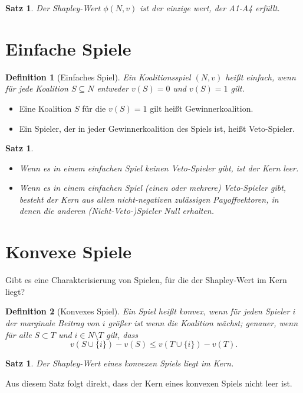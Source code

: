 \documentclass[12pt]{extreport} %
\theoremstyle{named}
\theoremstyle{itshape}
\newtheorem{satz}[unnamedtheorem]{Satz}
\newtheorem*{definition}{Definition}
\theoremstyle{normal}
\begin{document}
\begin{satz}
	Der Shapley-Wert $\phi(N, v)$ ist der einzige wert, der A1-A4 erfüllt.
\end{satz}

\section{Einfache Spiele} 

\begin{definition}[Einfaches Spiel]
	Ein Koalitionsspiel $(N, v)$ hei{\ss}t einfach, wenn für jede Koalition $S \subseteq N$ entweder $v(S) = 0$ und $v(S) = 1$ gilt.
\end{definition}

\begin{itemize}
	\item Eine Koalition $S$ für die $v(S) = 1$ gilt hei{\ss}t Gewinnerkoalition.
	\item Ein Spieler, der in jeder Gewinnerkoalition des Spiels ist, hei{\ss}t Veto-Spieler.
\end{itemize} 

\begin{satz} ~\
	\begin{itemize}
		\item Wenn es in einem einfachen Spiel keinen Veto-Spieler gibt, ist der Kern leer.
		\item Wenn es in einem einfachen Spiel (einen oder mehrere) Veto-Spieler gibt, besteht der Kern aus allen nicht-negativen zulässigen Payoffvektoren, in denen die anderen (Nicht-Veto-)Spieler Null erhalten.
	\end{itemize}
\end{satz}

\section{Konvexe Spiele} 

Gibt es eine Charakterisierung von Spielen, für die der Shapley-Wert im Kern liegt?

\begin{definition}[Konvexes Spiel]
	Ein Spiel heißt konvex, wenn für jeden Spieler $i$ der marginale Beitrag von $i$ grö{\ss}er ist wenn die Koalition wächst; genauer, wenn für alle $S \subset T$ und $i \in N \setminus T$ gilt, dass
	$$ v( S \cup \{i\}) - v(S) \leq v( T \cup \{ i \}) - v(T). $$
\end{definition}

\begin{satz}
	Der Shapley-Wert eines konvexen Spiels liegt im Kern.
\end{satz}
Aus diesem Satz folgt direkt, dass der Kern eines konvexen Spiels nicht leer ist.
\end{document}
